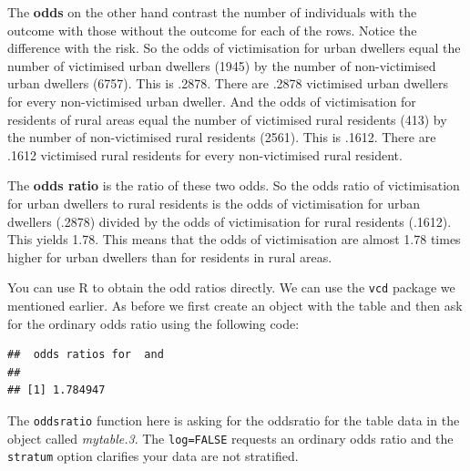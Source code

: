 \documentclass[
]{book}
\newenvironment{Shaded}{\begin{snugshade}}{\end{snugshade}}
\newcommand{\AttributeTok}[1]{\textcolor[rgb]{0.77,0.63,0.00}{#1}}
\newcommand{\ConstantTok}[1]{\textcolor[rgb]{0.00,0.00,0.00}{#1}}
\newcommand{\FloatTok}[1]{\textcolor[rgb]{0.00,0.00,0.81}{#1}}
\newcommand{\FunctionTok}[1]{\textcolor[rgb]{0.00,0.00,0.00}{#1}}
\newcommand{\NormalTok}[1]{#1}
\newcommand{\OtherTok}[1]{\textcolor[rgb]{0.56,0.35,0.01}{#1}}
\newcommand{\SpecialCharTok}[1]{\textcolor[rgb]{0.00,0.00,0.00}{#1}}
\begin{document}
The \textbf{odds} on the other hand contrast the number of individuals with the outcome with those without the outcome for each of the rows. Notice the difference with the risk. So the odds of victimisation for urban dwellers equal the number of victimised urban dwellers (1945) by the number of non-victimised urban dwellers (6757). This is .2878. There are .2878 victimised urban dwellers for every non-victimised urban dweller. And the odds of victimisation for residents of rural areas equal the number of victimised rural residents (413) by the number of non-victimised rural residents (2561). This is .1612. There are .1612 victimised rural residents for every non-victimised rural resident.

The \textbf{odds ratio} is the ratio of these two odds. So the odds ratio of victimisation for urban dwellers to rural residents is the odds of victimisation for urban dwellers (.2878) divided by the odds of victimisation for rural residents (.1612). This yields 1.78. This means that the odds of victimisation are almost 1.78 times higher for urban dwellers than for residents in rural areas.

You can use R to obtain the odd ratios directly. We can use the \texttt{vcd} package we mentioned earlier. As before we first create an object with the table and then ask for the ordinary odds ratio using the following code:

\begin{Shaded}
\end{Shaded}

\begin{verbatim}
##  odds ratios for  and  
## 
## [1] 1.784947
\end{verbatim}

The \texttt{oddsratio} function here is asking for the oddsratio for the table data in the object called \emph{mytable.3}. The \texttt{log=FALSE} requests an ordinary odds ratio and the \texttt{stratum} option clarifies your data are not stratified.
\end{document}

